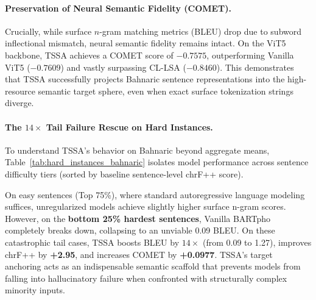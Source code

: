 \documentclass[11pt]{article}
\begin{document}
\paragraph{Preservation of Neural Semantic Fidelity (COMET).}
Crucially, while surface $n$-gram matching metrics (BLEU) drop due to subword inflectional mismatch, neural semantic fidelity remains intact. On the ViT5 backbone, TSSA achieves a COMET score of \textbf{$-0.7575$}, outperforming Vanilla ViT5 ($-0.7609$) and vastly surpassing CL-LSA ($-0.8460$). This demonstrates that TSSA successfully projects Bahnaric sentence representations into the high-resource semantic target sphere, even when exact surface tokenization strings diverge.

\paragraph{The $14\times$ Tail Failure Rescue on Hard Instances.}
To understand TSSA's behavior on Bahnaric beyond aggregate means, Table~\ref{tab:hard_instances_bahnaric} isolates model performance across sentence difficulty tiers (sorted by baseline sentence-level chrF++ score).

\begin{table}[!ht]
\centering\small
\caption{\textbf{Performance Breakdown by Difficulty Tier on Bahnaric $\rightarrow$ Vietnamese.} Demonstrating that TSSA rescues catastrophic zero-translation failure modes on hard instances by $14\times$.}
\label{tab:hard_instances_bahnaric}
\vspace{4pt}
\end{table}

On easy sentences (Top 75\%), where standard autoregressive language modeling suffices, unregularized models achieve slightly higher surface n-gram scores. However, on the \textbf{bottom 25\% hardest sentences}, Vanilla BARTpho completely breaks down, collapsing to an unviable 0.09 BLEU. On these catastrophic tail cases, TSSA boosts BLEU by \textbf{$14\times$} (from 0.09 to 1.27), improves chrF++ by \textbf{+2.95}, and increases COMET by \textbf{+0.0977}. TSSA's target anchoring acts as an indispensable semantic scaffold that prevents models from falling into hallucinatory failure when confronted with structurally complex minority inputs.
\end{document}
